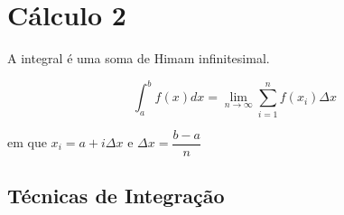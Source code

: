 \chapter{Cálculo 2}

A integral é uma soma de Himam infinitesimal.

\begin{equation}\label{8.1}
    \int_a^b f(x) dx = \lim_{n \to \infty} \sum_{  i=1}^{n  }{ f(x_i) \Delta x } 
\end{equation}

em que $x_i=a+i\Delta x$ e $\Delta x=\dfrac{b-a}{n}$

\section{Técnicas de Integração}



